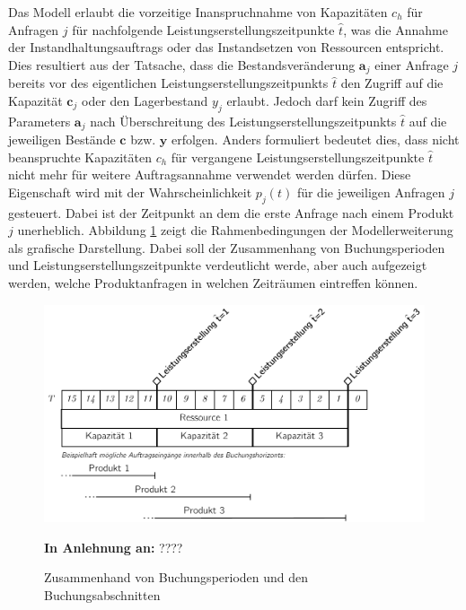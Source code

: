 Das Modell erlaubt die vorzeitige Inanspruchnahme von Kapazitäten $c_{h}$ für Anfragen $j$ für nachfolgende Leistungserstellungszeitpunkte $\hat{t}$, was die Annahme der Instandhaltungsauftrags oder das Instandsetzen von Ressourcen entspricht. Dies resultiert aus der Tatsache, dass die Bestandsveränderung $\textbf{a}_j$ einer Anfrage $j$ bereits vor des eigentlichen Leistungserstellungszeitpunkts $\hat t$ den Zugriff auf die Kapazität $\textbf{c}_j$ oder den Lagerbestand $y_{j}$ erlaubt. Jedoch darf kein Zugriff des Parameters $\textbf{a}_j$ nach Überschreitung des Leistungserstellungszeitpunkts $\hat t$ auf die jeweiligen Bestände $\textbf{c}$ bzw. $\textbf{y}$ erfolgen. Anders formuliert bedeutet dies, dass nicht beanspruchte Kapazitäten $c_{h}$ für vergangene Leistungserstellungszeitpunkte $\hat t$ nicht mehr für weitere Auftragsannahme verwendet werden dürfen. Diese Eigenschaft wird mit der Wahrscheinlichkeit $p_j(t)$ für die jeweiligen Anfragen $j$ gesteuert. Dabei ist der Zeitpunkt an dem die erste Anfrage nach einem Produkt $j$ unerheblich. Abbildung \ref{LP2} zeigt die Rahmenbedingungen der Modellerweiterung als grafische Darstellung. Dabei soll der Zusammenhang von Buchungsperioden und Leistungserstellungszeitpunkte verdeutlicht werde, aber auch aufgezeigt werden, welche Produktanfragen in welchen Zeiträumen eintreffen können.

\begin{figure}[h!]
  \begin{center}
    \includegraphics[width=130mm]{Bilder/Leistungsperioden2.pdf}
    \caption{Zusammenhand von Buchungsperioden und den Buchungsabschnitten}  \label{LP2}
    {\footnotesize \textbf{In Anlehnung an:} ????} 
  \end{center}
\end{figure}


